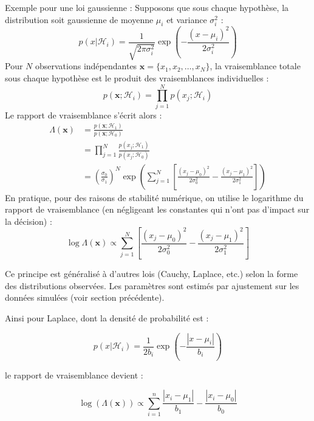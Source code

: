 \documentclass{article}
\begin{document}
Exemple pour une loi gaussienne :
Supposons que sous chaque hypothèse, la distribution soit gaussienne de moyenne $\mu_i$ et variance $\sigma_i^2$ :
\begin{equation}
    p(x|\mathcal{H}_i) = \frac{1}{\sqrt{2\pi\sigma_i^2}} \exp\left(-\frac{(x-\mu_i)^2}{2\sigma_i^2}\right)
\end{equation}
Pour $N$ observations indépendantes $\mathbf{x} = \{x_1, x_2, \ldots, x_N\}$, la vraisemblance totale sous chaque hypothèse est le produit des vraisemblances individuelles :
\begin{equation}
    p(\mathbf{x};\mathcal{H}_i) = \prod_{j=1}^N p(x_j;\mathcal{H}_i)
\end{equation}
Le rapport de vraisemblance s'écrit alors :
\begin{align}
    \Lambda(\mathbf{x}) &= \frac{p(\mathbf{x};\mathcal{H}_1)}{p(\mathbf{x};\mathcal{H}_0)} \\
    &= \prod_{j=1}^N \frac{p(x_j;\mathcal{H}_1)}{p(x_j;\mathcal{H}_0)} \\
    &= \left(\frac{\sigma_0}{\sigma_1}\right)^N \exp\left( \sum_{j=1}^N \left[ \frac{(x_j-\mu_0)^2}{2\sigma_0^2} - \frac{(x_j-\mu_1)^2}{2\sigma_1^2} \right] \right)
\end{align}
En pratique, pour des raisons de stabilité numérique, on utilise le logarithme du rapport de vraisemblance (en négligeant les constantes qui n'ont pas d'impact sur la décision) :
\begin{equation}
    \log \Lambda(\mathbf{x}) \propto \sum_{j=1}^N \left[ \frac{(x_j-\mu_0)^2}{2\sigma_0^2} - \frac{(x_j-\mu_1)^2}{2\sigma_1^2} \right]
\end{equation}

Ce principe est généralisé à d'autres lois (Cauchy, Laplace, etc.) selon la forme des distributions observées. Les paramètres sont estimés par ajustement sur les données simulées (voir section précédente).

Ainsi pour Laplace, dont la densité de probabilité est :

\begin{equation}
    p(x|\mathcal{H}_i) = \frac{1}{2b_i} \exp\left(-\frac{|x-\mu_i|}{b_i}\right)
\end{equation}

le rapport de vraisemblance devient :

\begin{equation}
    \log(\Lambda(\mathbf{x})) \propto \sum_{i=1}^{n} \frac{|x_i - \mu_1|}{b_1} - \frac{|x_i - \mu_0|}{b_0}
\end{equation}
\end{document}
